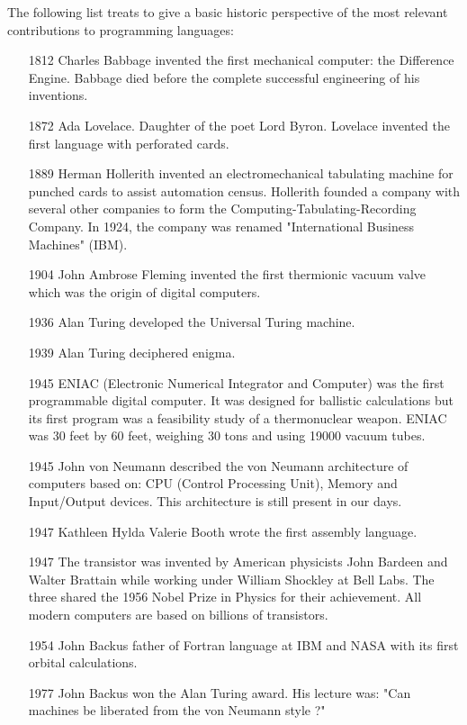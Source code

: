   
\newpage 
The following list treats to give a basic historic perspective
of the most relevant contributions  to programming languages:
 
 \begin{itemize} 
 \setlength\itemsep{0cm}
 \item[1812] Charles Babbage invented the first mechanical computer: the Difference Engine.
 Babbage died before the complete successful engineering of his inventions. 
 \item[1872]  Ada Lovelace. Daughter of the poet Lord Byron. Lovelace invented the first language with perforated cards. 
 \item[1889]   Herman Hollerith invented an electromechanical tabulating machine for punched cards 
 to assist automation census. Hollerith founded a company with several other companies to form the 
 Computing-Tabulating-Recording Company. In 1924, the company was renamed 
 "International Business Machines" (IBM). 
 \item[1904] John Ambrose Fleming invented the first thermionic  vacuum valve which was the origin
 of digital computers.  
 \item[1936] Alan Turing developed the  Universal Turing machine. 
 \item[1939] Alan Turing deciphered enigma. 
 \item[1945]
 ENIAC (Electronic Numerical Integrator and Computer) was the first programmable digital computer. 
 It was designed for ballistic calculations but its first program was a feasibility study 
 of a thermonuclear weapon.
 ENIAC was 30 feet by 60 feet, weighing 30 tons and using 19000 vacuum tubes.
 
 \item[1945]  John von Neumann described the von Neumann architecture of computers based on: 
 CPU (Control Processing Unit), Memory and Input/Output devices. 
 This architecture is still present in our days.
   
 
 
 \item[1947]  Kathleen Hylda Valerie Booth wrote the first assembly language.
 
 \item [1947] 
 The  transistor was invented by American physicists John Bardeen and Walter  Brattain 
 while working under William Shockley at Bell Labs. 
 The three shared the 1956 Nobel Prize in Physics for their achievement. All modern computers
 are based on billions of transistors. 
   
 
 \item[1954]  John Backus father of Fortran language at IBM and NASA 
 with its first orbital calculations.
 \item[1977]  John Backus won the Alan Turing award. 
  His lecture was: "Can machines be liberated from the von Neumann style ?" 
  \end{itemize}      


